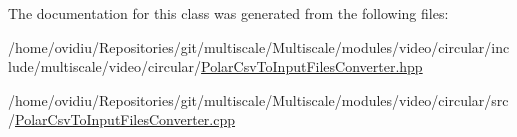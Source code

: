 \-The documentation for this class was generated from the following files\-:\begin{DoxyCompactItemize}
\item 
/home/ovidiu/\-Repositories/git/multiscale/\-Multiscale/modules/video/circular/include/multiscale/video/circular/\hyperlink{PolarCsvToInputFilesConverter_8hpp}{\-Polar\-Csv\-To\-Input\-Files\-Converter.\-hpp}\item 
/home/ovidiu/\-Repositories/git/multiscale/\-Multiscale/modules/video/circular/src/\hyperlink{PolarCsvToInputFilesConverter_8cpp}{\-Polar\-Csv\-To\-Input\-Files\-Converter.\-cpp}\end{DoxyCompactItemize}
